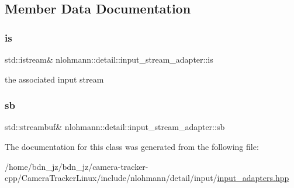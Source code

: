 \subsection{Member Data Documentation}
\mbox{\label{classnlohmann_1_1detail_1_1input__stream__adapter_ac3afada8eaf7d6cd2b475a3388d5e992}} 
\subsubsection{\texorpdfstring{is}{is}}
{\footnotesize\ttfamily std\+::istream\& nlohmann\+::detail\+::input\+\_\+stream\+\_\+adapter\+::is\hspace{0.3cm}{\ttfamily [private]}}



the associated input stream 

\mbox{\label{classnlohmann_1_1detail_1_1input__stream__adapter_addd96de4b5cbd9925ed5d8a0f0261143}} 
\subsubsection{\texorpdfstring{sb}{sb}}
{\footnotesize\ttfamily std\+::streambuf\& nlohmann\+::detail\+::input\+\_\+stream\+\_\+adapter\+::sb\hspace{0.3cm}{\ttfamily [private]}}



The documentation for this class was generated from the following file\+:\begin{DoxyCompactItemize}
\item 
/home/bdn\+\_\+jz/bdn\+\_\+jz/camera-\/tracker-\/cpp/\+Camera\+Tracker\+Linux/include/nlohmann/detail/input/\hyperlink{input__adapters_8hpp}{input\+\_\+adapters.\+hpp}\end{DoxyCompactItemize}
